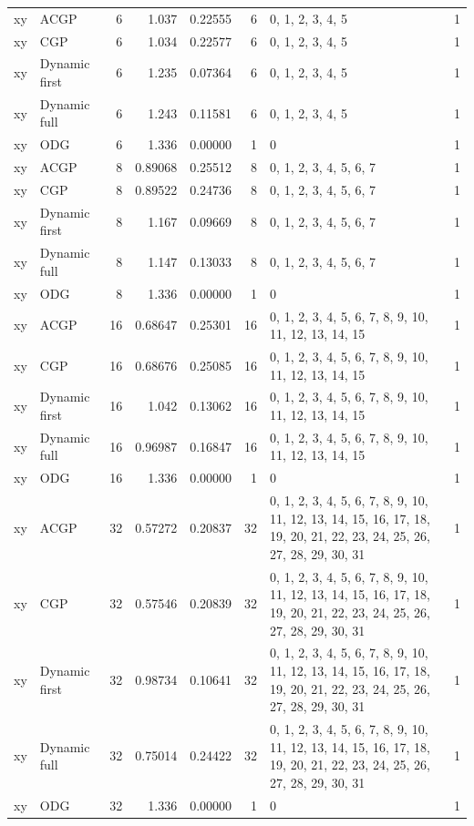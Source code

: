 \documentclass[10pt,a4paper]{article}
\begin{document}
\begin{longtable}{@{}p{23mm}p{29mm}rrrrp{36mm}r@{}}
xy & ACGP & 6 & 1.037 & 0.22555 & 6 & 0, 1, 2, 3, 4, 5 & 1 \\
xy & CGP & 6 & 1.034 & 0.22577 & 6 & 0, 1, 2, 3, 4, 5 & 1 \\
xy & Dynamic first & 6 & 1.235 & 0.07364 & 6 & 0, 1, 2, 3, 4, 5 & 1 \\
xy & Dynamic full & 6 & 1.243 & 0.11581 & 6 & 0, 1, 2, 3, 4, 5 & 1 \\
xy & ODG & 6 & 1.336 & 0.00000 & 1 & 0 & 1 \\
xy & ACGP & 8 & 0.89068 & 0.25512 & 8 & 0, 1, 2, 3, 4, 5, 6, 7 & 1 \\
xy & CGP & 8 & 0.89522 & 0.24736 & 8 & 0, 1, 2, 3, 4, 5, 6, 7 & 1 \\
xy & Dynamic first & 8 & 1.167 & 0.09669 & 8 & 0, 1, 2, 3, 4, 5, 6, 7 & 1 \\
xy & Dynamic full & 8 & 1.147 & 0.13033 & 8 & 0, 1, 2, 3, 4, 5, 6, 7 & 1 \\
xy & ODG & 8 & 1.336 & 0.00000 & 1 & 0 & 1 \\
xy & ACGP & 16 & 0.68647 & 0.25301 & 16 & 0, 1, 2, 3, 4, 5, 6, 7, 8, 9, 10, 11, 12, 13, 14, 15 & 1 \\
xy & CGP & 16 & 0.68676 & 0.25085 & 16 & 0, 1, 2, 3, 4, 5, 6, 7, 8, 9, 10, 11, 12, 13, 14, 15 & 1 \\
xy & Dynamic first & 16 & 1.042 & 0.13062 & 16 & 0, 1, 2, 3, 4, 5, 6, 7, 8, 9, 10, 11, 12, 13, 14, 15 & 1 \\
xy & Dynamic full & 16 & 0.96987 & 0.16847 & 16 & 0, 1, 2, 3, 4, 5, 6, 7, 8, 9, 10, 11, 12, 13, 14, 15 & 1 \\
xy & ODG & 16 & 1.336 & 0.00000 & 1 & 0 & 1 \\
xy & ACGP & 32 & 0.57272 & 0.20837 & 32 & 0, 1, 2, 3, 4, 5, 6, 7, 8, 9, 10, 11, 12, 13, 14, 15, 16, 17, 18, 19, 20, 21, 22, 23, 24, 25, 26, 27, 28, 29, 30, 31 & 1 \\
xy & CGP & 32 & 0.57546 & 0.20839 & 32 & 0, 1, 2, 3, 4, 5, 6, 7, 8, 9, 10, 11, 12, 13, 14, 15, 16, 17, 18, 19, 20, 21, 22, 23, 24, 25, 26, 27, 28, 29, 30, 31 & 1 \\
xy & Dynamic first & 32 & 0.98734 & 0.10641 & 32 & 0, 1, 2, 3, 4, 5, 6, 7, 8, 9, 10, 11, 12, 13, 14, 15, 16, 17, 18, 19, 20, 21, 22, 23, 24, 25, 26, 27, 28, 29, 30, 31 & 1 \\
xy & Dynamic full & 32 & 0.75014 & 0.24422 & 32 & 0, 1, 2, 3, 4, 5, 6, 7, 8, 9, 10, 11, 12, 13, 14, 15, 16, 17, 18, 19, 20, 21, 22, 23, 24, 25, 26, 27, 28, 29, 30, 31 & 1 \\
xy & ODG & 32 & 1.336 & 0.00000 & 1 & 0 & 1 \\

\end{longtable}
\end{document}
